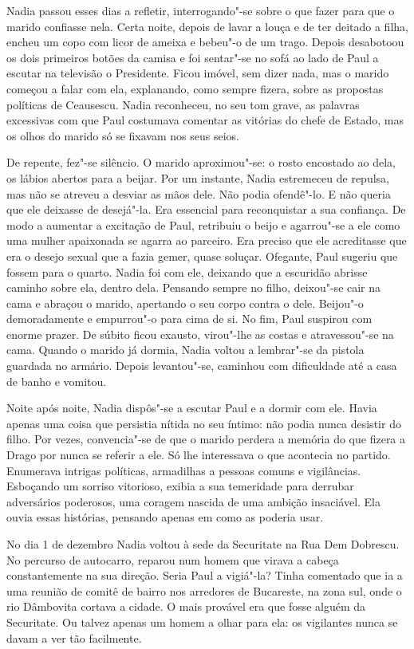 Nadia passou esses dias a refletir, interrogando"-se sobre o que fazer
para que o marido confiasse nela. Certa noite, depois de lavar a louça e
de ter deitado a filha, encheu um copo com licor de ameixa e bebeu"-o de
um trago. Depois desabotoou os dois primeiros botões da camisa e foi
sentar"-se no sofá ao lado de Paul a escutar na
televisão o Presidente. Ficou imóvel, sem dizer nada, mas o marido
começou a falar com ela, explanando, como sempre fizera, sobre as
propostas políticas de Ceausescu. Nadia reconheceu, no seu tom grave, as
palavras excessivas com que Paul costumava comentar as vitórias do
chefe de Estado, mas os olhos do marido só se fixavam nos seus seios.

De repente, fez"-se silêncio. O marido aproximou"-se: o rosto encostado ao
dela, os lábios abertos para a beijar. Por um instante, Nadia estremeceu
de repulsa, mas não se atreveu a desviar as mãos dele. Não podia
ofendê"-lo. E não queria que ele deixasse de desejá"-la. Era essencial
para reconquistar a sua confiança. De modo a aumentar a excitação de
Paul, retribuiu o beijo e agarrou"-se a ele como uma mulher apaixonada se
agarra ao parceiro. Era preciso que ele acreditasse que era o desejo
sexual que a fazia gemer, quase soluçar. Ofegante, Paul sugeriu que
fossem para o quarto. Nadia foi com ele, deixando que a escuridão
abrisse caminho sobre ela, dentro dela. Pensando sempre no filho,
deixou"-se cair na cama e abraçou o marido, apertando o seu corpo contra
o dele. Beijou"-o demoradamente e empurrou"-o para cima de si. No fim,
Paul suspirou com enorme prazer. De súbito ficou exausto, virou"-lhe as
costas e atravessou"-se na cama. Quando o marido já dormia, Nadia voltou
a lembrar"-se da pistola guardada no armário. Depois levantou"-se,
caminhou com dificuldade até a casa de banho e vomitou.

Noite após noite, Nadia dispôs"-se a escutar Paul e a
dormir com ele. Havia apenas uma coisa que persistia nítida no seu
íntimo: não podia nunca desistir do filho. Por
vezes, convencia"-se de que o marido perdera a memória do que fizera a
Drago por nunca se referir a ele. Só lhe interessava o que acontecia
no partido. Enumerava intrigas políticas, armadilhas a pessoas comuns e
vigilâncias. Esboçando um sorriso vitorioso, exibia a sua temeridade
para derrubar adversários poderosos, uma coragem nascida de uma ambição
insaciável. Ela ouvia essas histórias, pensando apenas em como as
poderia usar.

\bigskip

No dia 1 de dezembro Nadia voltou à sede da Securitate na Rua Dem
Dobrescu. No percurso de autocarro, reparou num homem que virava a
cabeça constantemente na sua direção. Seria Paul a vigiá"-la? Tinha
comentado que ia a uma reunião de comitê de bairro nos arredores de
Bucareste, na zona sul, onde o rio Dâmbovita cortava a cidade. O mais
provável era que fosse alguém da Securitate. Ou talvez apenas um homem
a olhar para ela: os vigilantes nunca se davam a ver tão facilmente.

